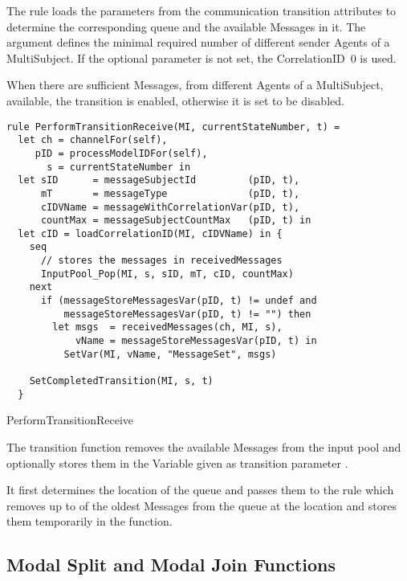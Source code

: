 The  rule loads the parameters from the communication transition attributes to determine the corresponding queue and the available Messages in it. The  argument defines the minimal required number of different sender Agents of a MultiSubject. If the optional parameter  is not set, the CorrelationID~0 is used.

When there are sufficient Messages, from different Agents of a MultiSubject, available, the transition is enabled, otherwise it is set to be disabled.



\begin{listing}[htbp]
\begin{verbatim}
rule PerformTransitionReceive(MI, currentStateNumber, t) =
  let ch = channelFor(self),
     pID = processModelIDFor(self),
       s = currentStateNumber in
  let sID      = messageSubjectId         (pID, t),
      mT       = messageType              (pID, t),
      cIDVName = messageWithCorrelationVar(pID, t),
      countMax = messageSubjectCountMax   (pID, t) in
  let cID = loadCorrelationID(MI, cIDVName) in {
    seq
      // stores the messages in receivedMessages
      InputPool_Pop(MI, s, sID, mT, cID, countMax)
    next
      if (messageStoreMessagesVar(pID, t) != undef and
          messageStoreMessagesVar(pID, t) != "") then
        let msgs  = receivedMessages(ch, MI, s),
            vName = messageStoreMessagesVar(pID, t) in
          SetVar(MI, vName, "MessageSet", msgs)

    SetCompletedTransition(MI, s, t)
  }
\end{verbatim}
\caption{PerformTransitionReceive}
\label{lst:shortasm:PerformTransitionReceive}
\end{listing}

The transition function removes the available Messages from the input pool and optionally stores them in the Variable given as transition parameter .

It first determines the location of the queue and passes them to the  rule which removes up to  of the oldest Messages from the queue at the location  and stores them temporarily in the  function.


\subsection{Modal Split and Modal Join Functions}


